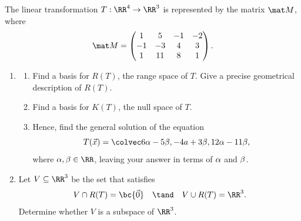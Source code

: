 \begin{problem}
    The linear transformation $T : \RR^4 \to \RR^3$ is represented by the matrix $\mat M$, where \[\mat M = \begin{pmatrix}1 & 5 & -1 & -2 \\ -1 & -3 & 4 & 3 \\ 1 & 11 & 8 & 1\end{pmatrix}.\]

    \begin{enumerate}
        \item \begin{enumerate}
            \item Find a basis for $R(T)$, the range space of $T$. Give a precise geometrical description of $R(T)$.
            \item Find a basis for $K(T)$, the null space of $T$.
            \item Hence, find the general solution of the equation \[T(\vec x) = \cveciii{6\a - 5\b}{-4a + 3\b}{12\a - 11\b},\] where $\a, \b \in \RR$, leaving your answer in terms of $\alpha$ and $\beta$.
        \end{enumerate}
        \item Let $V \subseteq \RR^3$ be the set that satisfies \[V \cap R(T) = \bc{\vec 0} \quad \tand \quad V \cup R(T) = \RR^3.\] Determine whether $V$ is a subspace of $\RR^3$.
    \end{enumerate}
\end{problem}
